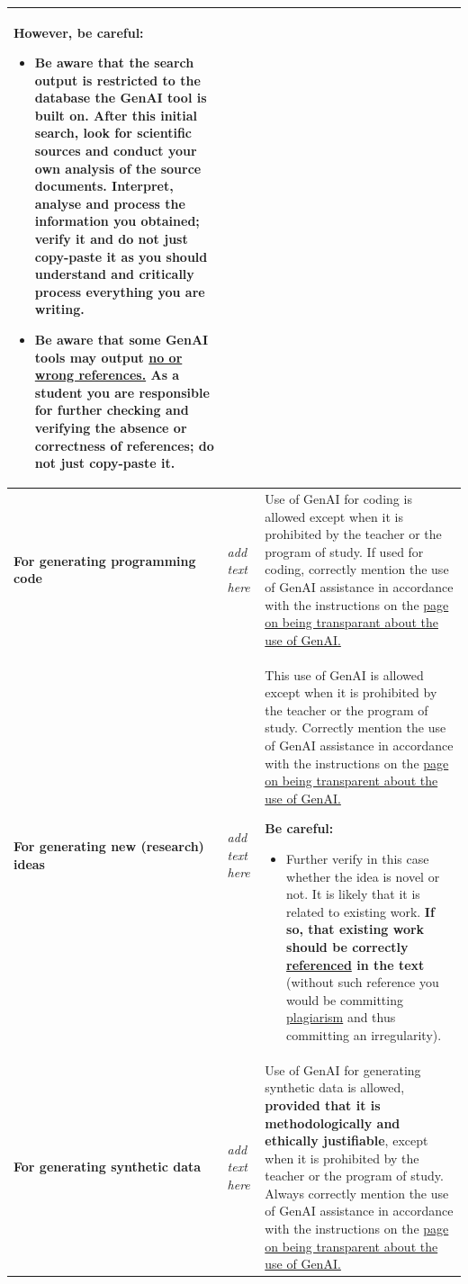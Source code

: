 \begin{longtable}{|p{}|p{}|p{}|}
\medskip
\textbf{However, be careful:}
\begin{itemize}
    \item Be aware that the search output is restricted to the database the GenAI tool is built on. After this initial search, look for scientific sources and conduct your own analysis of the source documents. \textbf{Interpret, analyse and process the information you obtained; verify it and do not just copy-paste it} as you should understand and critically process everything you are writing.
    \item Be aware that some GenAI tools may \textbf{output \href{https://www.kuleuven.be/english/education/leuvenlearninglab/support/toolguide/guidelines-for-safe-use-of-genai-tools}{no or wrong references.}} As a student you are responsible for further checking and verifying the absence or correctness of references; do not just copy-paste it.
\end{itemize} \\ \hline
\textbf{For generating programming code } & \textit{add text here} & Use of GenAI for coding is allowed except when it is prohibited by the teacher or the program of study. If used for coding, correctly mention the use of GenAI assistance in accordance with the instructions on the \href{https://www.kuleuven.be/english/education/student/educational-tools/generative-artificial-intelligence#Transparency}{page on being transparant about the use of GenAI.} \\ \hline
\textbf{For generating new (research) ideas} & \textit{add text here} & This use of GenAI is allowed except when it is prohibited by the teacher or the program of study. Correctly mention the use of GenAI assistance in accordance with the instructions on the \href{https://www.kuleuven.be/english/education/student/educational-tools/generative-artificial-intelligence#Transparency}{page on being transparent about the use of GenAI.}

\medskip
\textbf{Be careful:}
\begin{itemize}
    \item Further verify in this case whether the idea is novel or not. It is likely that it is related to existing work. \textbf{If so, that existing work should be correctly \href{https://bib.kuleuven.be/english/training-and-tutorials/citation}{referenced} in the text} (without such reference you would be committing \href{https://www.kuleuven.be/english/education/plagiarism/index}{plagiarism} and thus committing an irregularity).
\end{itemize}\\ \hline
\textbf{For generating synthetic data} & \textit{add text here} & Use of GenAI for generating synthetic data is allowed, \textbf{provided that it is methodologically and ethically justifiable}, except when it is prohibited by the teacher or the program of study. Always correctly mention the use of GenAI assistance in accordance with the instructions on the \href{https://www.kuleuven.be/english/education/student/educational-tools/generative-artificial-intelligence#Transparency}{page on being transparent about the use of GenAI.}


\end{longtable}
